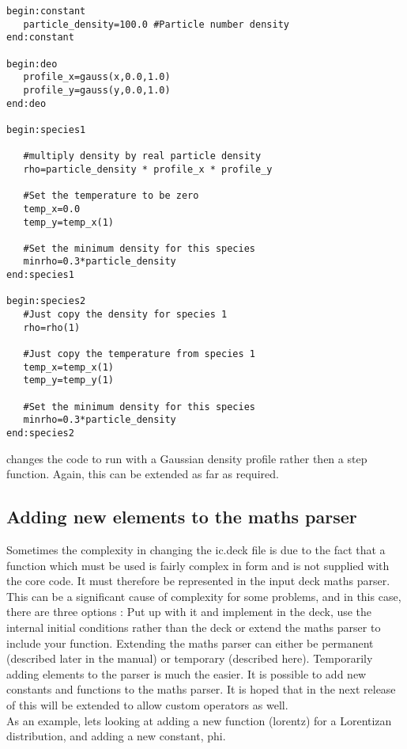 \documentclass[12pt,a4paper]{article}
\newcommand{\simpleboxverbatim}{\begin{Verbatim}[obeytabs=true,frame=single,
  framerule=0.5mm,rulecolor=\color{warwickmid},formatcom=\color{black}]}
\newcommand{\EPOCH}{{\color{warwickdark}\fontfamily{phv}\selectfont{EPOCH}}}
\begin{document}
\simpleboxverbatim
begin:constant
   particle_density=100.0 #Particle number density
end:constant

begin:deo
   profile_x=gauss(x,0.0,1.0)
   profile_y=gauss(y,0.0,1.0)
end:deo

begin:species1

   #multiply density by real particle density
   rho=particle_density * profile_x * profile_y

   #Set the temperature to be zero
   temp_x=0.0
   temp_y=temp_x(1)

   #Set the minimum density for this species
   minrho=0.3*particle_density
end:species1

begin:species2
   #Just copy the density for species 1
   rho=rho(1)

   #Just copy the temperature from species 1
   temp_x=temp_x(1)
   temp_y=temp_y(1)

   #Set the minimum density for this species
   minrho=0.3*particle_density
end:species2
\end{Verbatim}

changes the code to run with a Gaussian density profile rather then a step
function. Again, this can be extended as far as required.

\subsection{Adding new elements to the maths parser}
Sometimes the complexity in changing the ic.deck file is due to the fact that
a function which must be used is fairly complex in form and is not supplied
with the core code. It must therefore be represented in the input deck maths
parser. This can be a significant cause of complexity for some problems, and
in this case, there are three options : Put up with it and implement in the
deck, use the internal initial conditions rather than the deck or extend the
maths parser to include your function. Extending the maths parser can either
be permanent (described later in the manual) or temporary (described
here). Temporarily adding elements to the parser is much the easier. It is
possible to add new constants and functions to the maths parser. It is hoped
that in the next release of {\EPOCH} this will be extended to allow custom
operators as well.\\

As an example, lets looking at adding a new function (lorentz) for a
Lorentizan distribution, and adding a new constant, phi.
\end{document}
